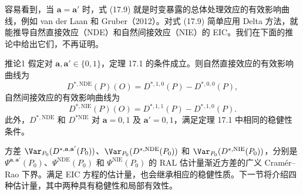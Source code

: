 容易看到，当 $\mathbf a=\mathbf a'$ 时，式 (17.9) 就是时变暴露的总体处理效应的有效影响曲线，例如 van der Laan 和 Gruber（2012）。对式 (17.9) 简单应用 Delta 方法，就能推导自然直接效应（NDE）和自然间接效应（NIE）的 EIC。我们在下面的推论中给出它们，不再证明。

\begin{bookresult}{推论}{1}
假定对 $\mathbf a,\mathbf a'\in\{0,1\}$，定理 17.1 的条件成立。则自然直接效应的有效影响曲线为
\[
 D^{*,\mathrm{NDE}}(P)(O)=D^{*,1,0}(P)-D^{*,0,0}(P),
\]
自然间接效应的有效影响曲线为
\[
 D^{*,\mathrm{NIE}}(P)(O)=D^{*,1,1}(P)-D^{*,1,0}(P).
\]
此外，$D^{*,\mathrm{NDE}}$ 和 $D^{*\mathrm{NIE}}$ 对 $\mathbf a=0,1$ 及 $\mathbf a'=0,1$，满足定理 17.1 中相同的稳健性条件。
\end{bookresult}

方差 $\Var_{P_0}(D^{*,\mathbf a,\mathbf a'}(P_0))$、$\Var_{P_0}(D^{*,\mathrm{NDE}}(P_0))$ 和 $\Var_{P_0}(D^{*,\mathrm{NIE}}(P_0))$，分别是 $\Psi^{\mathbf a,\mathbf a'}(P_0)$、$\Psi^{\mathrm{NDE}}(P_0)$ 和 $\Psi^{\mathrm{NIE}}(P_0)$ 的 RAL 估计量渐近方差的广义 Cramér--Rao 下界。满足 EIC 方程的估计量，也会继承相应的稳健性质。下一节将介绍四种估计量，其中两种具有稳健性和局部有效性。

